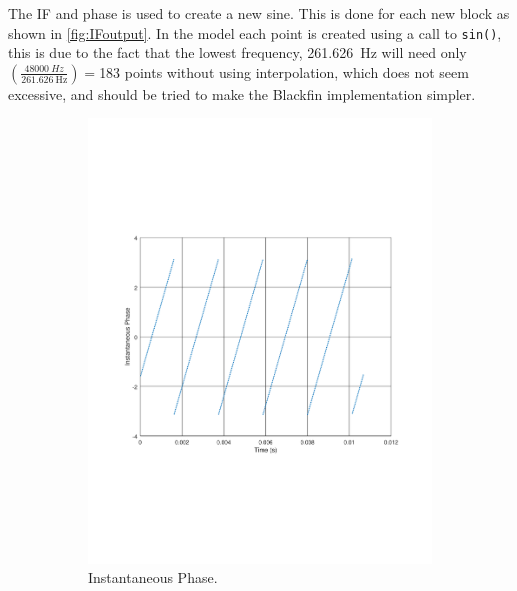 The IF and phase is used to create a new sine.
This is done for each new block as shown in \cref{fig:IFoutput}.
In the model each point is created using a call to \texttt{sin()}, this is due to the fact that the lowest frequency, \SI{261.626}{\hertz} will need only $(\frac{\SI{48000}{Hz}}{\SI{261.626}{\hertz}})=$\num{183} points without using interpolation, which does not seem excessive, and should be tried to make the Blackfin implementation simpler.

\begin{figure}
	\centering
	\begin{subfigure}[t]{.5\textwidth}
		\centering
		\includegraphics[width=.9\linewidth, clip, trim={2cm 7cm 2cm 7cm}]{gfx/Modelling/IFIP.pdf}
		\caption{Instantaneous Phase.}
		\label{fig:IFsub1}
	\end{subfigure}%
	\begin{subfigure}[t]{.5\textwidth}
		\centering

\end{subfigure}
\end{figure}
